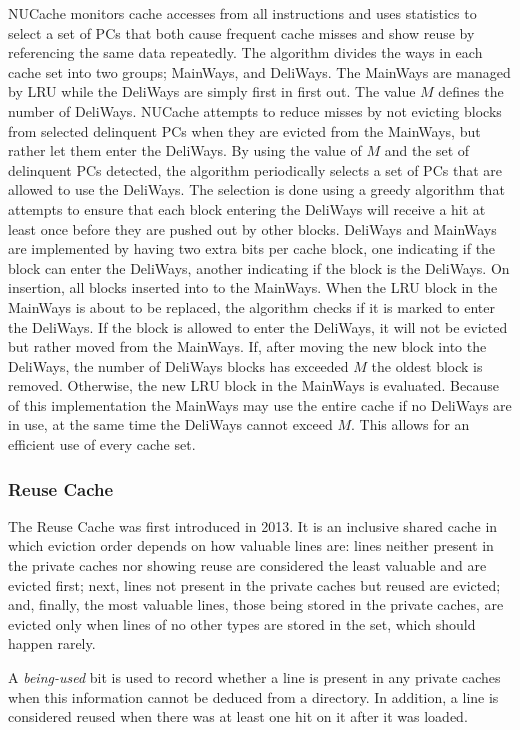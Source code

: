 NUCache monitors cache accesses from all instructions and uses statistics to select a set of PCs that both cause frequent cache misses and show reuse by referencing the same data repeatedly.
The algorithm divides the ways in each cache set into two groups; MainWays, and DeliWays.
The MainWays are managed by LRU while the DeliWays are simply first in first out.
The value $M$ defines the number of DeliWays.
NUCache attempts to reduce misses by not evicting blocks from selected delinquent PCs when they are evicted from the MainWays, but rather let them enter the DeliWays.
By using the value of $M$ and the set of delinquent PCs detected, the algorithm periodically selects a set of PCs that are allowed to use the DeliWays.
The selection is done using a greedy algorithm that attempts to ensure that each block entering the DeliWays will receive a hit at least once before they are pushed out by other blocks.
DeliWays and MainWays are implemented by having two extra bits per cache block, one indicating if the block can enter the DeliWays, another indicating if the block is the DeliWays.
On insertion, all blocks inserted into to the MainWays.
When the LRU block in the MainWays is about to be replaced, the algorithm checks if it is marked to enter the DeliWays.
If the block is allowed to enter the DeliWays, it will not be evicted but rather moved from the MainWays.
If, after moving the new block into the DeliWays, the number of DeliWays blocks has exceeded $M$ the oldest block is removed.
Otherwise, the new LRU block in the MainWays is evaluated.
Because of this implementation the MainWays may use the entire cache if no DeliWays are in use, at the same time the DeliWays cannot exceed $M$.
This allows for an efficient use of every cache set.

\subsubsection{Reuse Cache}

The Reuse Cache was first introduced in 2013.
It is an inclusive shared cache in which eviction order depends on how valuable lines are: lines neither present in the private caches nor showing reuse are considered the least valuable and are evicted first; next, lines not present in the private caches but reused are evicted; and, finally, the most valuable lines, those being stored in the private caches, are evicted only when lines of no other types are stored in the set, which should happen rarely.

A \textit{being-used} bit is used to record whether a line is present in any private caches when this information cannot be deduced from a directory. 
In addition, a line is considered reused when there was at least one hit on it after it was loaded.

